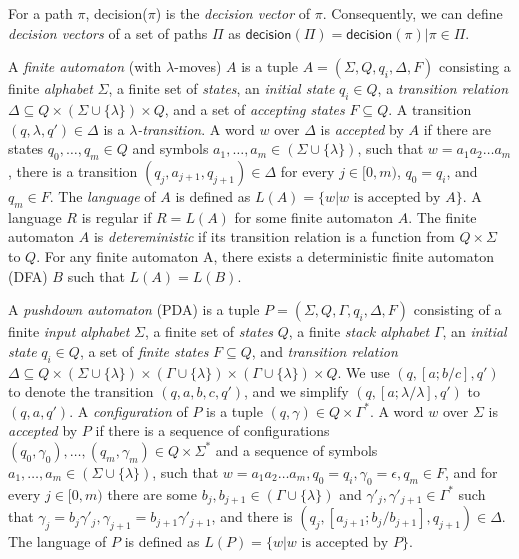 For a path $\pi$, \textsf{decision}($\pi$) is the \emph{decision vector} of $\pi$. Consequently, we can define \emph{decision vectors} of a set of paths $\Pi$ as $\mathsf{decision}(\Pi) = {\mathsf{decision}(\pi) | \pi \in \Pi}$.

A \emph{finite automaton} (with $\lambda$-moves) $A$ is a tuple $A = (\Sigma, Q, q_i, \Delta, F)$ consisting a finite \emph{alphabet} $\Sigma$, a finite set of \emph{states}, an \emph{initial state} $q_i \in Q$, a \emph{transition relation} $\Delta \subseteq Q \times (\Sigma \cup \{\lambda\}) \times Q$, and a set of \emph{accepting states} $F \subseteq Q$. A transition $(q, \lambda, q') \in \Delta$ is a \emph{$\lambda$-transition}. A word $w$ over $\Delta$ is \emph{accepted} by $A$ if there are states $q_0, \dots, q_m \in Q$ and symbols $a_1, \dots, a_m \in (\Sigma \cup \{\lambda\})$, such that $w = a_1a_2 \dots a_m$, there is a transition $(q_j, a_{j+1}, q_{j+1}) \in \Delta$ for every $j \in [0,m)$, $q_0 = q_i$, and $q_m \in F$. The \emph{language} of $A$ is defined as $L(A) = \{w|w \text{ is accepted by } A\} $. A language $R$ is regular if $R = L(A)$ for some finite automaton $A$. The finite automaton $A$ is \emph{detereministic} if its transition relation is a function from $Q \times \Sigma$ to $Q$. For any finite automaton A, there exists a deterministic finite automaton (DFA) $B$ such that $L(A) = L(B)$. 

A \emph{pushdown automaton} (PDA) is a tuple $P = (\Sigma, Q, \Gamma, q_i, \Delta, F)$ consisting of a finite \emph{input alphabet} $\Sigma$, a finite set of \emph{states} $Q$, a finite \emph{stack alphabet} $\Gamma$, an \emph{initial state} $q_i \in Q$, a set of \emph{finite states} $F \subseteq Q$, and \emph{transition relation} $\Delta \subseteq Q \times (\Sigma \cup \{\lambda\}) \times (\Gamma \cup \{\lambda\}) \times (\Gamma \cup \{\lambda\}) \times Q$. We use $(q, [a;b/c], q')$ to denote the transition $(q, a, b, c, q')$, and we simplify $(q, [a;\lambda/\lambda], q')$ to $(q, a, q')$. A \emph{configuration} of $P$ is a tuple $(q,\gamma) \in Q \times \Gamma^*$. A word $w$ over $\Sigma$ is \emph{accepted} by $P$ if there is a sequence of configurations $(q_0, \gamma_0), \dots, (q_m, \gamma_m) \in Q \times \Sigma^*$ and a sequence of symbols $a_1, \dots, a_m \in (\Sigma \cup \{\lambda\})$, such that $w=a_1a_2\dots a_m, q_0 = q_i, \gamma_0 = \epsilon, q_m \in F$, and for every $j \in [0,m)$ there are some $b_j, b_{j+1} \in (\Gamma \cup \{\lambda\})$ and $\gamma'_j, \gamma'_{j+1} \in \Gamma^*$ such that $\gamma_j = b_j\gamma'_j, \gamma_{j+1} = b_{j+1}\gamma'_{j+1}$, and there is $(q_j, [a_{j+1};b_j/b_{j+1}], q_{j+1}) \in \Delta$. The language of $P$ is defined as $L(P) = \{w | w \text{ is accepted by } P\}$.


